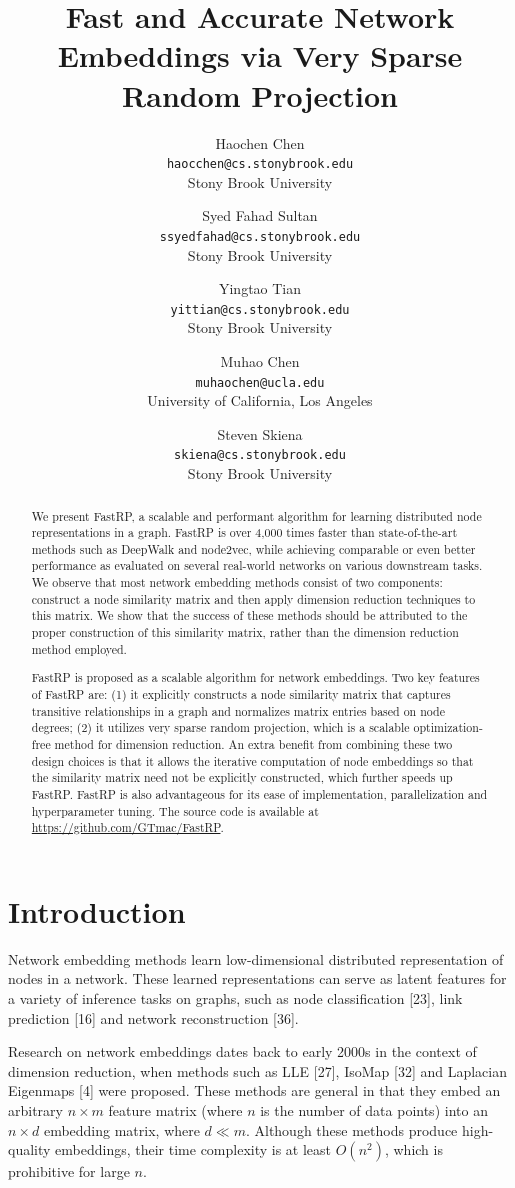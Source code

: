 \documentclass[11pt]{article}
\title{Fast and Accurate Network Embeddings via Very Sparse Random Projection}
\author{
Haochen Chen\\
\texttt{haocchen@cs.stonybrook.edu}\\
Stony Brook University
\and
Syed Fahad Sultan\\
\texttt{ssyedfahad@cs.stonybrook.edu}\\
Stony Brook University
\and
Yingtao Tian\\
\texttt{yittian@cs.stonybrook.edu}\\
Stony Brook University
\and
Muhao Chen\\
\texttt{muhaochen@ucla.edu}\\
University of California, Los Angeles
\and
Steven Skiena\\
\texttt{skiena@cs.stonybrook.edu}\\
Stony Brook University
}
\date{}
\begin{document}
\maketitle

\begin{abstract}
We present FastRP, a scalable and performant algorithm for learning distributed node representations in a graph. FastRP is over 4,000 times faster than state-of-the-art methods such as DeepWalk and node2vec, while achieving comparable or even better performance as evaluated on several real-world networks on various downstream tasks. We observe that most network embedding methods consist of two components: construct a node similarity matrix and then apply dimension reduction techniques to this matrix. We show that the success of these methods should be attributed to the proper construction of this similarity matrix, rather than the dimension reduction method employed.

FastRP is proposed as a scalable algorithm for network embeddings. Two key features of FastRP are: (1) it explicitly constructs a node similarity matrix that captures transitive relationships in a graph and normalizes matrix entries based on node degrees; (2) it utilizes very sparse random projection, which is a scalable optimization-free method for dimension reduction. An extra benefit from combining these two design choices is that it allows the iterative computation of node embeddings so that the similarity matrix need not be explicitly constructed, which further speeds up FastRP. FastRP is also advantageous for its ease of implementation, parallelization and hyperparameter tuning. The source code is available at \url{https://github.com/GTmac/FastRP}.
\end{abstract}

\section{Introduction}

Network embedding methods learn low-dimensional distributed representation of nodes in a network. These learned representations can serve as latent features for a variety of inference tasks on graphs, such as node classification [23], link prediction [16] and network reconstruction [36].

Research on network embeddings dates back to early 2000s in the context of dimension reduction, when methods such as LLE [27], IsoMap [32] and Laplacian Eigenmaps [4] were proposed. These methods are general in that they embed an arbitrary $n \times m$ feature matrix (where $n$ is the number of data points) into an $n \times d$ embedding matrix, where $d \ll m$. Although these methods produce high-quality embeddings, their time complexity is at least $O(n^2)$, which is prohibitive for large $n$.
\end{document}
